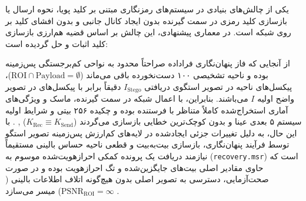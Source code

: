 




یکی از چالش‌های بنیادی در سیستم‌های رمزنگاری مبتنی بر کلید پویا، نحوه ارسال یا بازسازی کلید رمزی در سمت گیرنده بدون ایجاد کانال جانبی  و بدون افشای کلید بر روی شبکه است. در معماری پیشنهادی، این چالش بر اساس قضیه هم‌ارزی بازسازی کلید اثبات و حل گردیده است:\par



از آنجایی که فاز پنهان‌نگاری فراداده صراحتاً محدود به نواحی کم‌برجستگی پس‌زمینه بوده و ناحیه تشخیصی  ۱۰۰ دست‌نخورده باقی می‌ماند ($\mathrm{ROI} \cap \mathrm{Payload} = \emptyset$)، پیکسل‌های ناحیه  در تصویر استگوی دریافتی $I_{\mathrm{Stego}}$ دقیقاً برابر با پیکسل‌های  در تصویر واضح اولیه $I$ می‌باشند. بنابراین، با اعمال شبکه  در سمت گیرنده، ماسک  و ویژگی‌های آماری استخراج‌شده کاملاً متناظر با فرستنده بوده و چکیده ۲۵۶ بیتی  و شرایط اولیه سیستم ۵ بعدی عینا و بدون کوچک‌ترین خطایی بازسازی می‌گردند ($K_{\mathrm{Rec}} \equiv K_{\text{Send}}$) , . با این حال، به دلیل تغییرات جزئی ایجادشده در لایه‌های کم‌ارزش پس‌زمینه تصویر استگو توسط فرآیند پنهان‌نگاری، بازسازی بیت‌به‌بیت و قطعی ناحیه حساس بالینی مستقیماً نیازمند دریافت یک پرونده کمکی احرازهویت‌شده موسوم به  (\texttt{recovery.msr}) است که حاوی مقادیر اصلی بیت‌های جایگزین‌شده و تگ احرازهویت  بوده و در صورت صحت‌آزمایی، دسترسی به تصویر اصلی بدون هیچ‌گونه اتلاف اطلاعات بالینی ($\text{PSNR}_{\mathrm{ROI}} = \infty$) میسر می‌سازد .\par




